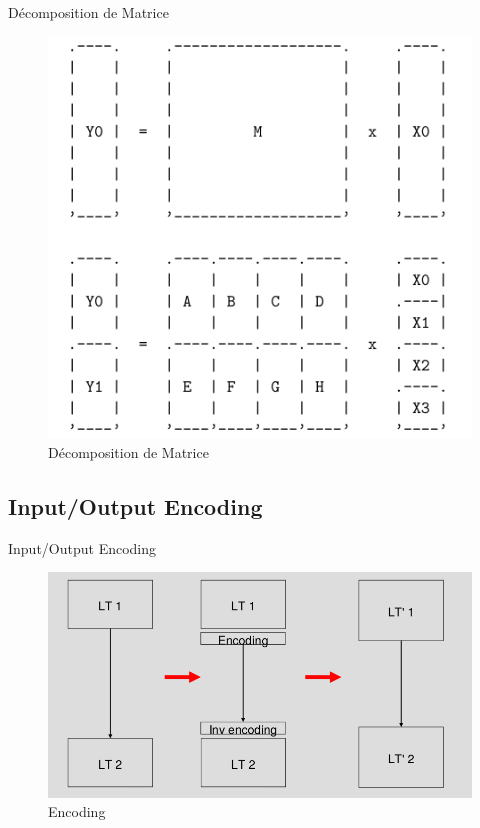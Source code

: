 \documentclass{beamer}
\begin{document}
\begin{frame}{Décomposition de Matrice}
  \begin{figure}[h]
    \centering
    \includegraphics[scale=0.50]{images/decompo_matrice.png}
    \caption{Décomposition de Matrice}
    \label{fig:keygen}
  \end{figure}
\end{frame}

\subsection{Input/Output Encoding}

\begin{frame}{Input/Output Encoding}
  \begin{figure}[h]
    \centering
    \includegraphics[scale=0.5]{images/encoding.png}
    \caption{Encoding}
    \label{fig:keygen}
  \end{figure}
\end{frame}
\end{document}
